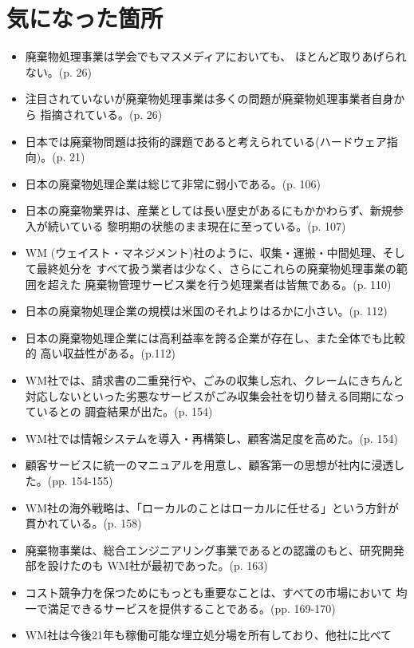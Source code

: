 \documentclass[a4j]{jsarticle}
\begin{document}
\section{気になった箇所}
\begin{itemize}
\item
  廃棄物処理事業は学会でもマスメディアにおいても、
  ほとんど取りあげられない。(p. 26)
\item
  注目されていないが廃棄物処理事業は多くの問題が廃棄物処理事業者自身から
  指摘されている。(p. 26)
\item
  日本では廃棄物問題は技術的課題であると考えられている(ハードウェア指向)。(p. 21)
\item
  日本の廃棄物処理企業は総じて非常に弱小である。(p. 106)
\item
  日本の廃棄物業界は、産業としては長い歴史があるにもかかわらず、新規参入が続いている
  黎明期の状態のまま現在に至っている。(p. 107)
\item
  WM (ウェイスト・マネジメント)社のように、収集・運搬・中間処理、そして最終処分を
  すべて扱う業者は少なく、さらにこれらの廃棄物処理事業の範囲を超えた
  廃棄物管理サービス業を行う処理業者は皆無である。(p. 110)
\item
  日本の廃棄物処理企業の規模は米国のそれよりはるかに小さい。(p. 112)
\item
  日本の廃棄物処理企業には高利益率を誇る企業が存在し、また全体でも比較的
  高い収益性がある。(p.112)
\item
  WM社では、請求書の二重発行や、ごみの収集し忘れ、クレームにきちんと
  対応しないといった劣悪なサービスがごみ収集会社を切り替える同期になっているとの
  調査結果が出た。(p. 154)
\item
  WM社では情報システムを導入・再構築し、顧客満足度を高めた。(p. 154)
\item
  顧客サービスに統一のマニュアルを用意し、顧客第一の思想が社内に浸透した。(pp. 154-155)
\item
  WM社の海外戦略は、「ローカルのことはローカルに任せる」という方針が
  貫かれている。(p. 158)
\item
  廃棄物事業は、総合エンジニアリング事業であるとの認識のもと、研究開発部を設けたのも
  WM社が最初であった。(p. 163)
\item
  コスト競争力を保つためにもっとも重要なことは、すべての市場において
  均一で満足できるサービスを提供することである。(pp. 169-170)
\item
  WM社は今後21年も稼働可能な埋立処分場を所有しており、他社に比べて

\end{itemize}
\end{document}
